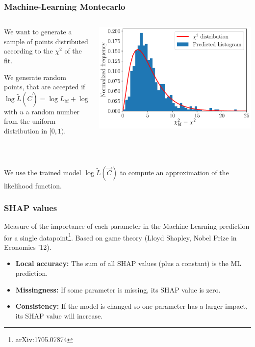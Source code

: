 \documentclass[mathserif, 10pt]{beamer}
\begin{document}
\begin{frame}
    \frametitle{Machine-Learning Montecarlo}
    \begin{columns}
        \begin{column}{0.5\textwidth}
            We want to generate a sample of points distributed according to the $\chi^2$ of the fit.

            We generate random points, that are accepted if
            $$\log \tilde{L}(\vec{C}) = \log L_\mathrm{bf} + \log u\,,$$
            with $u$ a random number from the uniform distribution in $[0,1)$.
        \end{column}
        \begin{column}{0.5\textwidth}
            \includegraphics[width=\columnwidth]{figures/hist_xgb.pdf}
        \end{column}
    \end{columns}
    
    ~

    We use the trained model $\log\tilde{L}(\vec{C})$ to compute an approximation of the likelihood function.

\end{frame}

\begin{frame}
    \frametitle{SHAP values}

    Measure of the importance of each parameter in the Machine Learning prediction for a single datapoint\footnote[1]{arXiv:1705.07874}. Based on game theory (Lloyd Shapley, Nobel Prize in Economics '12).


    \begin{itemize}
        \item \textbf{Local accuracy:} The sum of all SHAP values (plus a constant) is the ML prediction.
        \item \textbf{Missingness:} If some parameter is missing, its SHAP value is zero.
        \item \textbf{Consistency:} If the model is changed so one parameter has a larger impact, its SHAP value will increase.
    \end{itemize}


\end{frame}
\end{document}
